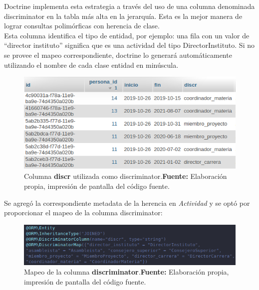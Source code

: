 Doctrine implementa esta estrategia a través del uso de una columna denominada discriminator en la tabla más alta en la jerarquía\@. Esta es la mejor
manera de lograr consultas polimórficas con herencia de clase\@. \parencite{doctrine-inheritance}\\
\noindent
Esta columna identifica el tipo de entidad, por ejemplo: una
fila con un valor de ``director instituto'' significa que es una actividad del tipo DirectorInstituto\@.
Si no se provee el mapeo correspondiente, doctrine lo generará automáticamente utilizando el nombre de cada clase entidad en minúscula\@. \parencite{doctrine-inheritance}

\begin{figure}[H]
    \includegraphics[width=1\linewidth]{image/discriminator-doctrine.png}
    \caption[Columna \textbf{discr} utilizada como discriminator]{Columna \textbf{discr} utilizada como discriminator.\newline \textbf{Fuente:} Elaboración propia, impresión de pantalla del código fuente.}
    \label{fig:image/discriminator-doctrine.png}
\end{figure}
\newpage
Se agregó la correspondiente metadata de la herencia en \textit{Actividad} y se optó por proporcionar el mapeo de la columna discriminator:

\begin{figure}[h]
    \includegraphics[width=1\linewidth]{image/discr.png}
    \caption[Mapeo de la columna \textbf{discriminator}]{Mapeo de la columna \textbf{discriminator}.\newline \textbf{Fuente:} Elaboración propia, impresión de pantalla del código fuente.}
    \label{fig:image/discr.png}
\end{figure}

